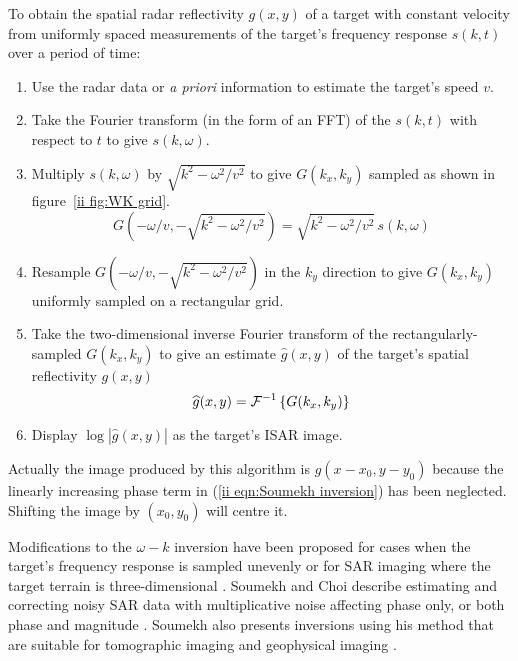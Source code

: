 \begin{algorithm}
\label{ii alg:w-k}\mbox{}\par

To obtain the spatial radar reflectivity $g(x,y)$ of a target with constant
velocity from uniformly spaced measurements of the target's frequency
response $s(k,t)$ over a period of time:
\begin{enumerate}
\item Use the radar data or {\em a priori\/} information to estimate the 
target's speed $v$.

\item Take the Fourier transform (in the form of an FFT) of the $s(k,t)$ 
with respect to $t$ to give $s(k,\omega)$.

\item Multiply $s(k,\omega)$ by $\sqrt{k^2-\omega^2/v^2}$ to give $G(k_x,k_y)$
sampled as shown in figure~\ref{ii fig:WK grid}.
\begin{equation}
G(-\omega/v,-\sqrt{k^2-\omega^2/v^2})=\sqrt{k^2-\omega^2/v^2}\,s(k,\omega)
\end{equation}

\item Resample $G(-\omega/v,-\sqrt{k^2-\omega^2/v^2})$ in the $k_y$
direction to give $G(k_x,k_y)$ uniformly sampled on a rectangular grid.

\item Take the two-dimensional inverse Fourier transform of the
rectangularly-sampled $G(k_x,k_y)$ to give an estimate $\widehat{g}(x,y)$
of the target's spatial reflectivity $g(x,y)$
\begin{equation}
\widehat{g}(x,y)={\cal F}^{-1}\left\{G(k_x,k_y)\right\}
\end{equation}

\item Display $\log\left|\widehat{g}(x,y)\right|$ as the target's ISAR image.
\end{enumerate}
\end{algorithm}

Actually the image produced by this algorithm is $g(x-x_0,y-y_0)$ because
the linearly increasing phase term in (\ref{ii eqn:Soumekh inversion}) has
been neglected.  Shifting the image by $(x_0,y_0)$ will centre it.

Modifications to the $\omega-k$ inversion have been proposed for cases when
the target's frequency response is sampled unevenly or for SAR imaging where
the target terrain is three-dimensional \cite{Fly92}.  Soumekh and Choi
describe estimating and correcting noisy SAR data with multiplicative noise
affecting phase only, or both phase and magnitude \cite{Sou92b}.  Soumekh
also presents inversions using his method that are suitable for tomographic
imaging and geophysical imaging \cite{Sou94}.

